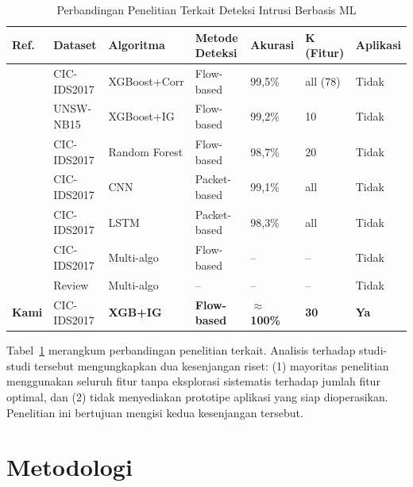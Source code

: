 \documentclass[conference,a4paper]{IEEEtran}
\begin{document}
\begin{table}[t]
\vspace{-0.2cm}
\caption{Perbandingan Penelitian Terkait Deteksi Intrusi Berbasis ML}
\label{tab:related_work}
\centering
\small
\setlength{\tabcolsep}{6pt}
\begin{tabular}{p{1.5cm}p{2.0cm}p{2.5cm}p{2.5cm}p{1.8cm}p{1.5cm}p{1.5cm}}
\toprule
\textbf{Ref.} & \textbf{Dataset} & \textbf{Algoritma} & \textbf{Metode Deteksi} &
\textbf{Akurasi} & \textbf{K (Fitur)} & \textbf{Aplikasi} \\
\midrule
\cite{ref_thakkar2020}     & CIC-IDS2017 & XGBoost+Corr  & Flow-based & 99,5\% & all (78) & Tidak \\
\cite{ref_kasongo2020}     & UNSW-NB15   & XGBoost+IG    & Flow-based & 99,2\% & 10 & Tidak \\
\cite{ref_ullah2020}       & CIC-IDS2017 & Random Forest & Flow-based & 98,7\% & 20 & Tidak \\
\cite{ref_cnn_ids}         & CIC-IDS2017 & CNN           & Packet-based & 99,1\% & all & Tidak \\
\cite{ref_lstm_ids}        & CIC-IDS2017 & LSTM          & Packet-based & 98,3\% & all & Tidak \\
\cite{ref_leevy2020}       & CIC-IDS2017 & Multi-algo    & Flow-based & -- & -- & Tidak \\
\cite{ref_abdulganiyu2023} & Review      & Multi-algo    & -- & -- & -- & Tidak \\
\textbf{Kami}              & CIC-IDS2017 & \textbf{XGB+IG} & \textbf{Flow-based} & \textbf{$\approx$100\%} & \textbf{30} & \textbf{Ya} \\
\bottomrule
\end{tabular}
\end{table}

Tabel~\ref{tab:related_work} merangkum perbandingan penelitian terkait. Analisis terhadap studi-studi tersebut mengungkapkan dua kesenjangan riset: (1) mayoritas penelitian menggunakan seluruh fitur tanpa eksplorasi sistematis terhadap jumlah fitur optimal, dan (2) tidak menyediakan prototipe aplikasi yang siap dioperasikan. Penelitian ini bertujuan mengisi kedua kesenjangan tersebut.

\section{Metodologi}
\label{sec:metode}
\end{document}
